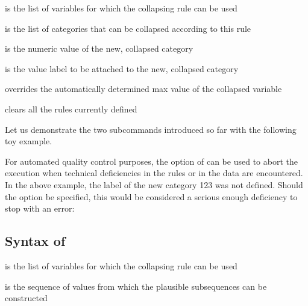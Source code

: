 \hangpara
{} is the list of variables for which the collapsing rule can be used

\hangpara
{} is the list of categories that can be collapsed according to this rule

\hangpara
{} is the numeric value of the new, collapsed category

\hangpara
{} is the value label to be attached to the new, collapsed category

\hangpara
{} overrides the automatically determined max value of the collapsed variable

\hangpara
{} clears all the rules currently defined

\bigskip

Let us demonstrate the two subcommands introduced so far with the following toy example.

\begin{stlog}
\nullskip
\end{stlog}

For automated quality control purposes, the  option 
of  can be used to abort the execution
when technical deficiencies in the rules or in the data are encountered. 
In the above example, the label of the new category 123 was not defined. 
Should the  option be specified, 
this would be considered a serious enough deficiency to stop with an error:

\begin{stlog}
\nullskip
\end{stlog}

\subsection{Syntax of }



\hangpara
{} is the list of variables for which the collapsing rule can be used

\hangpara
{} is the sequence of values from which the plausible subsequences can be constructed

